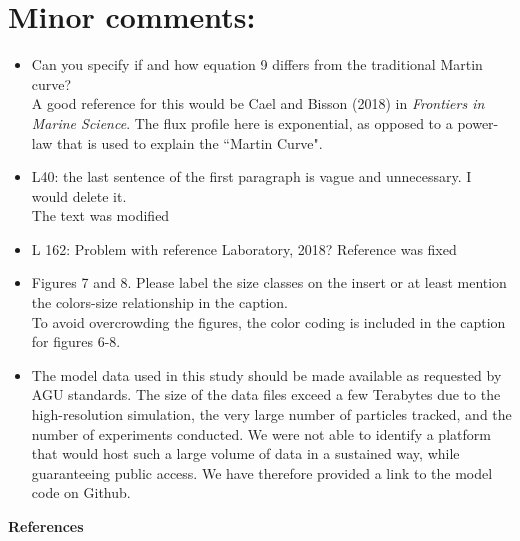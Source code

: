 \documentclass[12pt,letter]{article}
\begin{document}
\section*{Minor comments:}
\begin{itemize}
	\item Can you specify if and how equation 9 differs from the traditional Martin curve?\\
	{\color{blue} A good reference for this would be Cael and Bisson (2018) in \textit{Frontiers in Marine Science}. The flux profile here is exponential, as opposed to a power-law that is used to explain the ``Martin Curve".}


	\item L40: the last sentence of the first paragraph is vague and unnecessary. I would delete it.\\
	{\color{blue} The text was modified\\}
	\item L 162: Problem with reference Laboratory, 2018?
	{\color{blue} Reference was fixed\\}
	\item Figures 7 and 8. Please label the size classes on the insert or at least mention the colors-size relationship in the caption.\\
	{\color{blue} To avoid overcrowding the figures, the color coding is included in the caption for figures 6-8.\\}


	\item The model data used in this study should be made available as requested by AGU standards.
	{\color{blue} The size of the data files exceed a few Terabytes due to the high-resolution simulation,  the very large number of particles tracked, and the number of experiments conducted. We were not able to identify a platform that would host such a large volume of data in a sustained way, while guaranteeing public access. We have therefore provided a link to the model code on Github.\\}
\end{itemize}

{\bf References}\\
\end{document}
